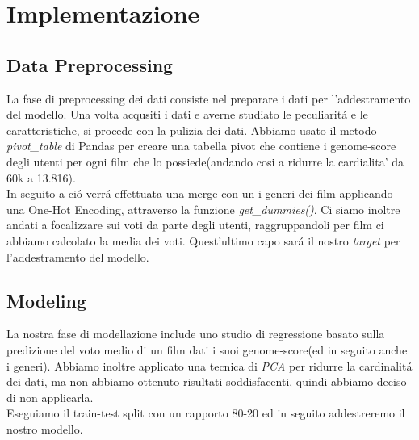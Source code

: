 \documentclass[../../Report.tex]{subfiles}
\begin{document}
\chapter{Implementazione}
\section{Data Preprocessing}
La fase di preprocessing dei dati consiste nel preparare i dati per l'addestramento del modello.
Una volta acqusiti i dati e averne studiato le peculiaritá e le caratteristiche, si procede con la pulizia dei dati.
Abbiamo usato il metodo \textit{pivot\_table} di Pandas per creare una tabella pivot che contiene i genome-score degli utenti per ogni film che lo possiede(andando cosi a ridurre la cardialita' da 60k a 13.816).\\
In seguito a ció verrá effettuata una merge con un i generi dei film applicando una One-Hot Encoding, attraverso la funzione \textit{get\_dummies()}.
Ci siamo inoltre andati a focalizzare sui voti da parte degli utenti, raggruppandoli per film ci abbiamo calcolato la media dei voti.
Quest'ultimo capo sará il nostro \textit{target} per l'addestramento del modello.\\

\section{Modeling}
La nostra fase di modellazione include uno studio di regressione basato sulla predizione del voto medio di un film dati i suoi genome-score(ed in seguito anche i generi).
Abbiamo inoltre applicato una tecnica di \textit{PCA} per ridurre la cardinalitá dei dati, ma non abbiamo ottenuto risultati soddisfacenti, quindi abbiamo deciso di non applicarla.\\

Eseguiamo il train-test split con un rapporto 80-20 ed in seguito addestreremo il nostro modello.
\end{document}
